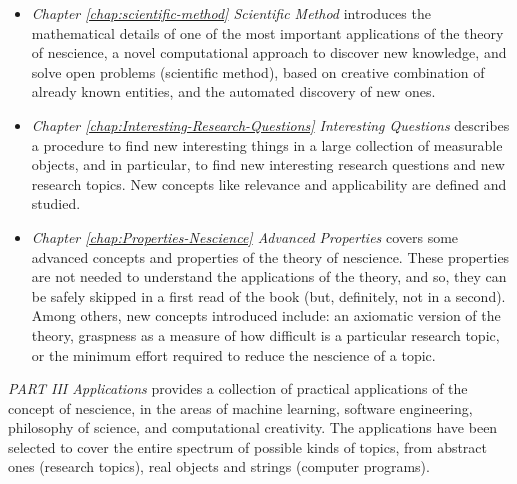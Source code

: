 \begin{itemize}
\item \emph{Chapter \ref{chap:scientific-method} Scientific Method} introduces the mathematical details of one of the most important applications of the theory of nescience, a novel computational approach to discover new knowledge, and solve open problems (scientific method), based on creative combination of already known entities, and the automated discovery of new ones.

\item \emph{Chapter \ref{chap:Interesting-Research-Questions} Interesting Questions} describes a procedure to find new interesting things in a large collection of measurable objects, and in particular, to find new interesting research questions and new research topics. New concepts like relevance and applicability are defined and studied.

\item \emph{Chapter \ref{chap:Properties-Nescience} Advanced Properties} covers some advanced concepts and properties of the theory of nescience. These properties are not needed to understand the applications of the theory, and so, they can be safely skipped in a first read of the book (but, definitely, not in a second). Among others, new concepts introduced include: an axiomatic version of the theory, graspness as a measure of how difficult is a particular research topic, or the minimum effort required to reduce the nescience of a topic.

\end{itemize}

\bigskip

\emph{PART III Applications} provides a collection of practical applications of the concept of nescience, in the areas of machine learning, software engineering, philosophy of science, and computational creativity. The applications have been selected to cover the entire spectrum of possible kinds of topics, from abstract ones (research topics), real objects and strings (computer programs).

